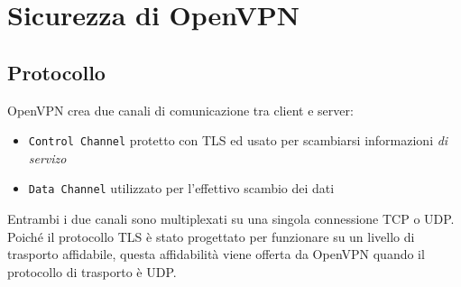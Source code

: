 \section{Sicurezza di OpenVPN}
\subsection{Protocollo}
OpenVPN crea due canali di comunicazione tra client e server:
\begin{itemize}
  \item \texttt{Control Channel} protetto con TLS ed usato per scambiarsi informazioni
  \textit{di servizo}
  \item \texttt{Data Channel} utilizzato per l'effettivo scambio dei dati
\end{itemize}
Entrambi i due canali sono multiplexati su una singola connessione TCP o UDP.
Poiché il protocollo TLS è stato progettato per funzionare su un livello di trasporto affidabile,
questa affidabilità viene offerta da OpenVPN quando il protocollo di trasporto è UDP.

